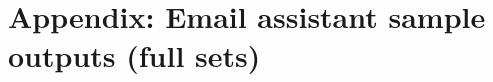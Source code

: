 \section*{Appendix: Email assistant sample outputs (full sets)}\label{app:email-assistant-samples}




